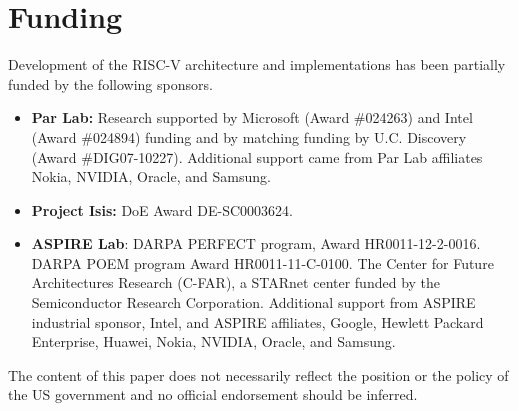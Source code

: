 \section{Funding}

Development of the RISC-V architecture and implementations has been
partially funded by the following sponsors.
\begin{itemize}

\item {\bf Par Lab:} Research supported by Microsoft (Award \#024263) and Intel (Award
    \#024894) funding and by matching funding by U.C. Discovery
    (Award \#DIG07-10227). Additional support came from Par Lab
    affiliates Nokia, NVIDIA, Oracle, and Samsung.

\item {\bf Project Isis:} DoE Award DE-SC0003624.

\item {\bf ASPIRE Lab}: DARPA PERFECT program, Award
    HR0011-12-2-0016.  DARPA POEM program Award HR0011-11-C-0100.  The
    Center for Future Architectures Research (C-FAR), a STARnet center
    funded by the Semiconductor Research Corporation.  Additional
    support from ASPIRE industrial sponsor, Intel, and ASPIRE
    affiliates, Google, Hewlett Packard Enterprise, Huawei, Nokia,
    NVIDIA, Oracle, and Samsung.

\end{itemize}

The content of this paper does not necessarily reflect the position or the
policy of the US government and no official endorsement should be
inferred. 
